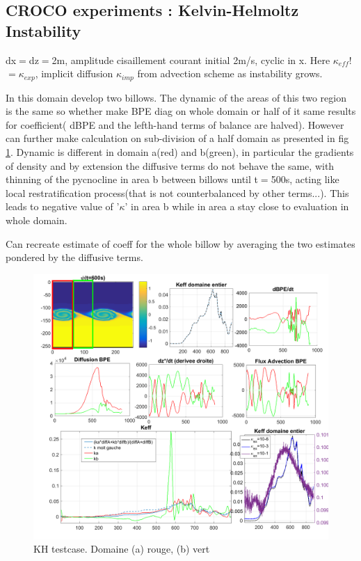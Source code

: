 \subsection{CROCO experiments : Kelvin-Helmoltz Instability}

dx$=$dz$=$2m, amplitude cisaillement courant initial 2m/s, cyclic in x. Here $\kappa_{eff}$!$= \kappa_{exp}$, implicit diffusion $\kappa_{imp}$ from advection scheme as instability grows.

In this domain develop two billows. The dynamic of the areas of this two region is the same so whether make BPE diag on whole domain or half of it same results for coefficient( dBPE and the lefth-hand terms of balance are halved).
However can further make calculation on sub-division of a half domain as presented in fig \ref{figCkh}. Dynamic is different in domain a(red) and b(green), in particular the gradients of density and by extension the diffusive terms do not behave the same, with thinning of the pycnocline in area b between billows until t$=$500s, acting like local restratification process(that is not counterbalanced by other terms...). This leads to negative value of '$\kappa$' in area b while in area a stay close to evaluation in whole domain.

Can recreate estimate of coeff for the whole billow by averaging the two estimates pondered by the diffusive terms. 


\begin{figure}[h!]
\centering
\includegraphics[width=1\textwidth]{./CHAP_BPE/AGBPE_numlab8-3c.png}
\caption{KH testcase. Domaine (a) rouge, (b) vert}
\label{figCkh}
\end{figure}


